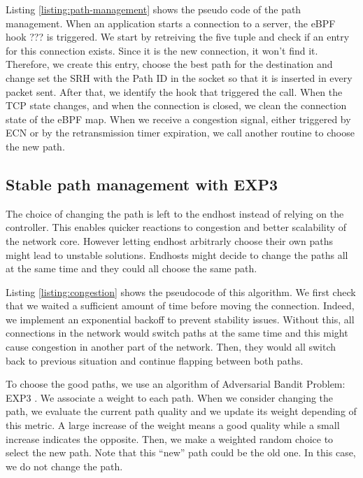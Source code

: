 


Listing \ref{listing:path-management} shows the pseudo code of the path management.
When an application starts a connection to a server, the eBPF hook ??? is triggered.
We start by retreiving the five tuple and check if an entry for this connection exists.
Since it is the new connection, it won't find it. Therefore, we create this entry,
choose the best path for the destination and change set the SRH with the Path ID
in the socket so that it is inserted in every packet sent.
After that, we identify the hook that triggered the call. When the TCP state changes, and
when the connection is closed, we clean the connection state of the eBPF map. When we receive
a congestion signal, either triggered by ECN or by the retransmission timer expiration,
we call another routine to choose the new path.

\subsection{Stable path management with EXP3}

The choice of changing the path is left to the endhost instead of relying on the controller.
This enables quicker reactions to congestion and better scalability of the network core.
However letting endhost arbitrarly choose their own paths might lead to unstable solutions.
Endhosts might decide to change the paths all at the same time and they could all choose the same path.

Listing \ref{listing:congestion} shows the pseudocode of this algorithm.
We first check that we waited a sufficient amount of time before moving the connection.
Indeed, we implement an exponential backoff to prevent stability issues. Without this, all connections in the network
would switch paths at the same time and this might cause congestion in another part of the network.
Then, they would all switch back to previous situation and continue flapping between both paths.

To choose the good paths, we use an algorithm of Adversarial Bandit Problem: EXP3 \cite{exp3}.
We associate a weight to each path. When we consider changing the path, we evaluate the current path quality
and we update its weight depending of this metric. A large increase of the weight means a good quality while
a small increase indicates the opposite.
Then, we make a weighted random choice to select the new path.
Note that this ``new'' path could be the old one. In this case, we do not change the path.

